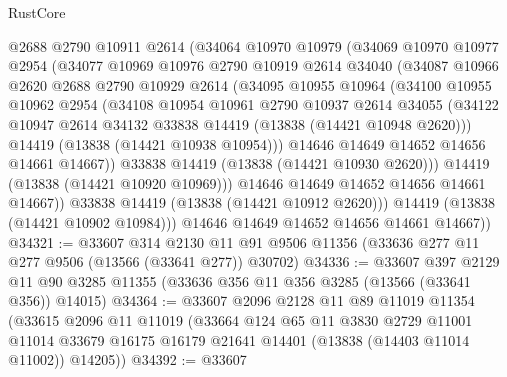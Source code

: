 \begin{lexlean}{RustCore}
\begin{coremodule}
            @2688
            @2790
            @10911
            @2614
            (@34064
              @10970
              @10979
              (@34069
                @10970
                @10977
                @2954
                (@34077
                  @10969
                  @10976
                  @2790
                  @10919
                  @2614
                  @34040
                  (@34087
                    @10966
                    @2620
                    @2688
                    @2790
                    @10929
                    @2614
                    (@34095
                      @10955
                      @10964
                      (@34100
                        @10955
                        @10962
                        @2954
                        (@34108
                          @10954
                          @10961
                          @2790
                          @10937
                          @2614
                          @34055
                          (@34122 @10947 @2614 @34132 @33838 @14419 (@13838 (@14421 @10948 @2620)))
                          @14419
                          (@13838 (@14421 @10938 @10954)))
                        @14646
                        @14649
                        @14652
                        @14656
                        @14661
                        @14667))
                    @33838
                    @14419
                    (@13838 (@14421 @10930 @2620)))
                  @14419
                  (@13838 (@14421 @10920 @10969)))
                @14646
                @14649
                @14652
                @14656
                @14661
                @14667))
            @33838
            @14419
            (@13838 (@14421 @10912 @2620)))
          @14419
          (@13838 (@14421 @10902 @10984)))
        @14646
        @14649
        @14652
        @14656
        @14661
        @14667))
@34321 := @33607
    @314
    @2130
    @11
    @91
    @9506
    @11356
    (@33636 @277 @11 @277 @9506 (@13566 (@33641 @277)) @30702)
@34336 := @33607
    @397
    @2129
    @11
    @90
    @3285
    @11355
    (@33636 @356 @11 @356 @3285 (@13566 (@33641 @356)) @14015)
@34364 := @33607
    @2096
    @2128
    @11
    @89
    @11019
    @11354
    (@33615
      @2096
      @11
      @11019
      (@33664
        @124
        @65
        @11
        @3830
        @2729
        @11001
        @11014
        @33679
        @16175
        @16179
        @21641
        @14401
        (@13838 (@14403 @11014 @11002))
        @14205))
@34392 := @33607

\end{coremodule}
\end{lexlean}
